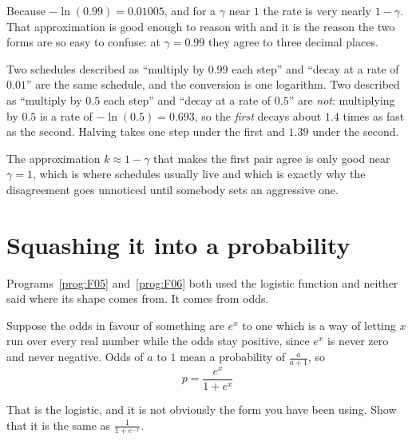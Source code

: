\begin{fr}
Because $-\ln(\num{0.99}) = \num{0.01005}$, and for a $\gamma$ near $1$ the
rate is very nearly $1 - \gamma$. That approximation is good enough to reason
with and it is the reason the two forms are so easy to confuse: at
$\gamma = \num{0.99}$ they agree to three decimal places.

\begin{aibox}
Two schedules described as \enquote{multiply by $\num{0.99}$ each step} and
\enquote{decay at a rate of $\num{0.01}$} are the same schedule, and the
conversion is one logarithm. Two described as \enquote{multiply by
$\num{0.5}$ each step} and \enquote{decay at a rate of $\num{0.5}$} are
\emph{not}: multiplying by $\num{0.5}$ is a rate of
$-\ln(\num{0.5}) = \num{0.693}$, so the \emph{first} decays about
$\num{1.4}$ times as fast as the second. Halving takes one step under the
first and $\num{1.39}$ under the second.

The approximation $k \approx 1 - \gamma$ that makes the first pair agree is
only good near $\gamma = 1$, which is where schedules usually live and which
is exactly why the disagreement goes unnoticed until somebody sets an
aggressive one.
\end{aibox}
\end{fr}

\section{Squashing it into a probability}
\label{sec:F07-logistic}

\begin{fr}
Programs~\ref{prog:F05} and~\ref{prog:F06} both used the logistic function and
neither said where its shape comes from. It comes from odds.

Suppose the odds in favour of something are $e^{x}$ to one \dash{} which is
a way of letting $x$ run over every real number while the odds stay
positive, since $e^{x}$ is never zero and never negative. Odds of $a$ to $1$
mean a probability of $\frac{a}{a+1}$, so
\[ p = \frac{e^{x}}{1 + e^{x}} \]

That is the logistic, and it is not obviously the form you have been using.
Show that it is the same as $\frac{1}{1 + e^{-x}}$.
\nextframe
\end{fr}

